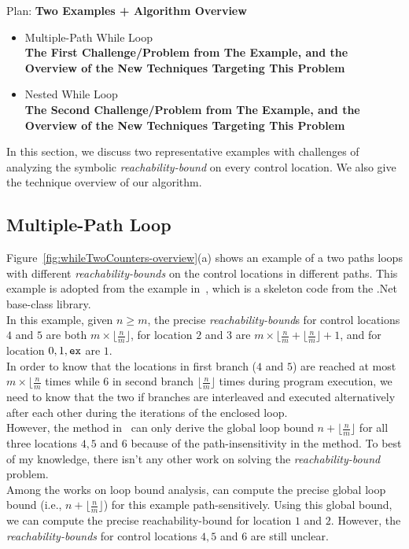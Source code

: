 Plan:
\textbf{Two Examples + Algorithm Overview}
\begin{itemize}
\item {Multiple-Path While Loop}
\\
\textbf{The First Challenge/Problem from The Example, 
and the Overview of the New Techniques Targeting This Problem}
\item {Nested While Loop}
\\
\textbf{The Second Challenge/Problem from The Example,
and the Overview of the New Techniques Targeting This Problem}
\end{itemize}
In this section, we discuss two representative examples with
challenges of analyzing the symbolic
\emph{reachability-bound} on
every control location.
We also give the technique overview of our algorithm.
%
\subsection{Multiple-Path Loop}
\label{sec:overview-multiplepath}

Figure~\ref{fig:whileTwoCounters-overview}(a) shows an example of a two paths loops
with different \emph{reachability-bounds} on the control locations in different paths.
This example is adopted from the example in~\cite{Sumit2010rechability}, which
is a skeleton code from the .Net base-class library.
\\
In this example, given $n \geq m$,
the precise \emph{reachability-bound}s for control locations $4$ and $5$ are both $m \times \lfloor\frac{n}{m}\rfloor$,
for location $2$ and $3$ are $m \times \lfloor\frac{n}{m} + \lfloor\frac{n}{m}\rfloor + 1$, 
and for location $0, 1, \mathtt{ex}$ are $1$.
\\
In order to know that the locations in first branch ($4$ and $5$) are reached at most $m \times \lfloor\frac{n}{m}$ times
while $6$ in second branch $\lfloor\frac{n}{m}\rfloor$ times
 during program execution,
we need to know that the two if branches are interleaved and executed alternatively after each other
during the iterations of the enclosed loop.
\\
However, the method in~\cite{Sumit2010rechability}
can only derive the global loop bound $n + \lfloor\frac{n}{m}\rfloor$
for all three locations $4, 5$ and $6$ because of the path-insensitivity in the method.
To best of my knowledge, there isn't any other work on solving the \emph{reachability-bound} problem.
\\
Among the works on loop bound analysis, \cite{GulwaniJK09} can compute the precise global
loop bound (i.e., $n + \lfloor\frac{n}{m}\rfloor$) for this example path-sensitively.
Using this global bound, we can compute the precise reachability-bound for location $1$ and $2$.
However, the  \emph{reachability-bounds} for control locations $4, 5$ and $6$ are still unclear.
